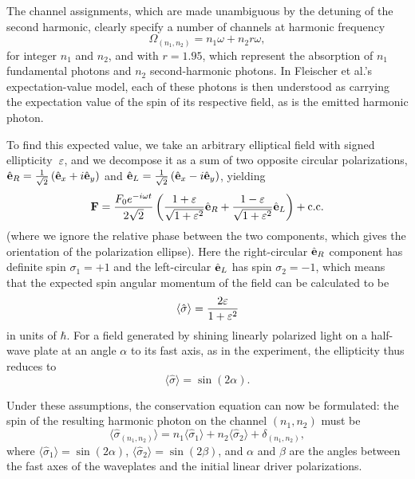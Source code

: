 The channel assignments, which are made unambiguous by the detuning of the second harmonic, clearly specify a number of channels at harmonic frequency
\begin{equation}
 \Omega_{(n_1,n_2)}=n_1\omega+n_2 r\omega,
\end{equation}
for integer $n_1$ and $n_2$, and with $r=1.95$, which represent the absorption of $n_1$ fundamental photons and $n_2$ second-harmonic photons. In Fleischer et al.'s expectation-value model, each of these photons is then understood as carrying the expectation value of the spin of its respective field, as is the emitted harmonic photon.


To find this expected value, we take an arbitrary elliptical field with signed ellipticity~$\varepsilon$, and we decompose it as a sum of two opposite circular polarizations, $\hat{\vb{e}}_R=\tfrac{1}{\sqrt{2}}\left(\hat{\vb{e}}_x+i\hat{\vb{e}}_y\right)$ and $\hat{\vb{e}}_L=\tfrac{1}{\sqrt{2}}\left(\hat{\vb{e}}_x-i\hat{\vb{e}}_y\right)$, yielding
\begin{equation}
 \vb{F}=
 \frac{F_0e^{-i\omega t}}{2\sqrt{2}}
 \left(
 \frac{1+\varepsilon}{\sqrt{1+\varepsilon^2}}\hat{\vb{e}}_R
 +
  \frac{1-\varepsilon}{\sqrt{1+\varepsilon^2}}\hat{\vb{e}}_L
 \right)
 +\mathrm{c.c.}
 \label{e8-elliptical-as-sum-of-circular-polarizations}
\end{equation}
(where we ignore the relative phase between the two components, which gives the orientation of the polarization ellipse). Here the right-circular $\hat{\vb{e}}_R$ component has definite spin $\sigma_1=+1$ and the left-circular $\hat{\vb{e}}_L$ has spin $\sigma_2=-1$, which means that the expected spin angular momentum of the field can be calculated to be
\begin{equation}
 \langle\hat{\sigma}\rangle=\frac{2\varepsilon}{1+\varepsilon^2}
 \label{e8-expected-angular-momentum-ellitpicity}
\end{equation}
in units of $\hbar$. For a field generated by shining linearly po\-la\-rized light on a half-wave plate at an angle $\alpha$ to its fast axis, as in the experiment, the ellipticity thus reduces to 
\begin{equation}
 \langle\hat{\sigma}\rangle=\sin(2\alpha).
 \label{e8-expected-angular-momentum-from-angle}
\end{equation}



Under these assumptions, the conservation equation can now be formulated: the spin of the resulting harmonic photon on the channel $(n_1,n_2)$ must be
\begin{equation}
 \langle\hat\sigma_{(n_1,n_2)}\rangle=n_1\langle\hat\sigma_1\rangle + n_2\langle\hat\sigma_2\rangle + \delta_{(n_1,n_2)},
 \label{e8-model-1-equation}
\end{equation}
where $\langle\hat{\sigma}_1\rangle=\sin(2\alpha)$,  $\langle\hat{\sigma}_2\rangle=\sin(2\beta)$, and $\alpha$ and $\beta$ are the angles between the fast axes of the waveplates and the initial linear driver polarizations. 


